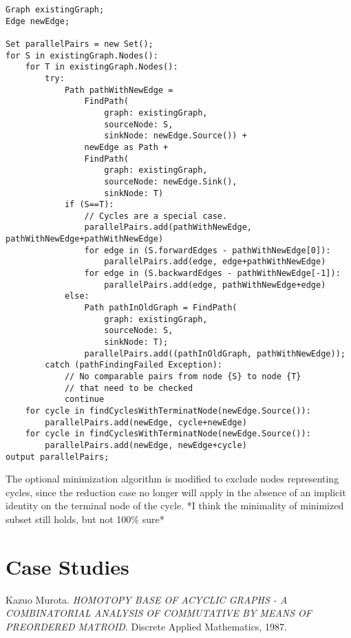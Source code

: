 \documentclass{article}
\begin{document}
\begin{verbatim}
Graph existingGraph;
Edge newEdge;

Set parallelPairs = new Set();
for S in existingGraph.Nodes():
    for T in existingGraph.Nodes():
        try:
            Path pathWithNewEdge = 
                FindPath(
                    graph: existingGraph, 
                    sourceNode: S,
                    sinkNode: newEdge.Source()) +
                newEdge as Path +
                FindPath(
                    graph: existingGraph, 
                    sourceNode: newEdge.Sink(), 
                    sinkNode: T)
            if (S==T):
                // Cycles are a special case.
                parallelPairs.add(pathWithNewEdge, pathWithNewEdge+pathWithNewEdge)
                for edge in (S.forwardEdges - pathWithNewEdge[0]):
                    parallelPairs.add(edge, edge+pathWithNewEdge)
                for edge in (S.backwardEdges - pathWithNewEdge[-1]):
                    parallelPairs.add(edge, pathWithNewEdge+edge)
            else:
                Path pathInOldGraph = FindPath(
                    graph: existingGraph, 
                    sourceNode: S, 
                    sinkNode: T);
                parallelPairs.add((pathInOldGraph, pathWithNewEdge));
        catch (pathFindingFailed Exception):
            // No comparable pairs from node {S} to node {T} 
            // that need to be checked
            continue
    for cycle in findCyclesWithTerminatNode(newEdge.Source()):
        parallelPairs.add(newEdge, cycle+newEdge)
    for cycle in findCyclesWithTerminatNode(newEdge.Source()):
        parallelPairs.add(newEdge, newEdge+cycle)
output parallelPairs;
\end{verbatim}

The optional minimization algorithm is modified to exclude nodes representing cycles, since the reduction case no longer will apply in the absence of an implicit identity on the terminal node of the cycle.
*I think the minimality of minimized subset still holds, but not 100\% sure*

\section{Case Studies}

\begin{thebibliography}{9}
Kazuo Murota. 
\textit{HOMOTOPY BASE OF ACYCLIC GRAPHS - A COMBINATORIAL ANALYSIS OF COMMUTATIVE BY MEANS OF PREORDERED MATROID}. 
Discrete Applied Mathematics, 1987.

\end{thebibliography}
\end{document}
